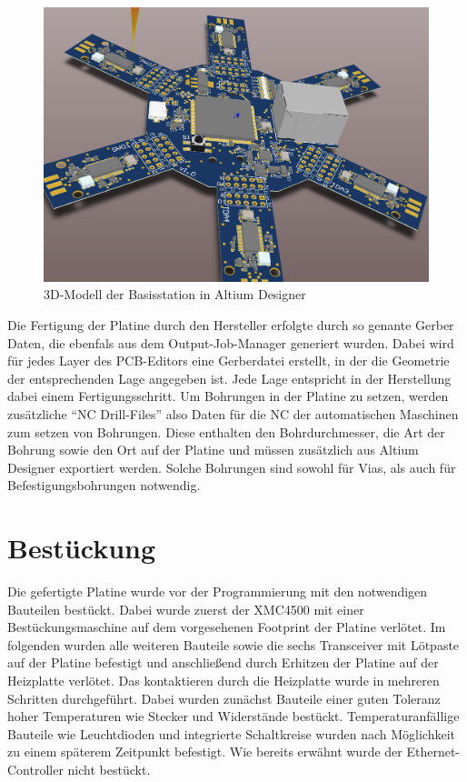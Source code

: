 \begin{figure}[h] 
	\centering
	\includegraphics[width=0.5\linewidth]{Abbildungen/Aufnahmen/Bilder/Altium/3D2}
	\caption{3D-Modell der Basisstation in Altium Designer}
	\label{fig:3D}
\end{figure}




Die Fertigung der Platine durch den Hersteller erfolgte durch so genante Gerber Daten, die ebenfals aus dem Output-Job-Manager generiert wurden. Dabei wird für jedes Layer des \ac{PCB}-Editors eine Gerberdatei erstellt, in der die Geometrie der entsprechenden Lage angegeben ist. Jede Lage entspricht in der Herstellung dabei einem Fertigungsschritt. Um Bohrungen in der Platine zu setzen, werden zusätzliche \enquote{NC Drill-Files} also Daten für die \ac{NC} der automatischen Maschinen zum setzen von Bohrungen. Diese enthalten den Bohrdurchmesser, die Art der Bohrung sowie den Ort auf der Platine und müssen zusätzlich aus Altium Designer exportiert werden. Solche Bohrungen sind sowohl für Vias, als auch für Befestigungsbohrungen notwendig.


\section{Bestückung}
Die gefertigte Platine wurde vor der Programmierung mit den notwendigen Bauteilen bestückt. Dabei wurde zuerst der XMC4500 mit einer Bestückungsmaschine auf dem vorgesehenen Footprint der Platine verlötet. Im folgenden wurden alle weiteren Bauteile sowie die sechs Transceiver mit Lötpaste auf der Platine befestigt und anschließend durch Erhitzen der Platine auf der Heizplatte verlötet. Das kontaktieren durch die Heizplatte wurde in mehreren Schritten durchgeführt. Dabei wurden zunächst Bauteile einer guten Toleranz hoher Temperaturen wie Stecker und Widerstände bestückt. Temperaturanfällige Bauteile wie Leuchtdioden und integrierte Schaltkreise wurden nach Möglichkeit zu einem späterem Zeitpunkt befestigt. Wie bereits erwähnt wurde der Ethernet-Controller nicht bestückt.

